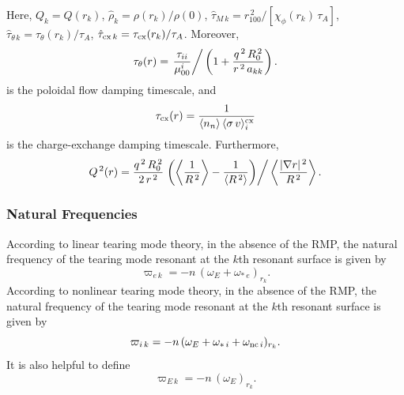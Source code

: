 \documentclass[12pt,prb,aps]{revtex4-1}
\begin{document}
Here, $Q_k = Q(r_k)$, $\hat{\rho}_k=\rho(r_k)/\rho(0)$, $\hat{\tau}_{M\,k}= r_{100}^{\,2}/[\chi_\phi(r_k)\,\tau_A]$,  $\hat{\tau}_{\theta\,k}=\tau_\theta(r_k)/\tau_A$, $\hat{\tau}_{{\rm cx}\,k} =\tau_{{\rm cx}}(r_k)/\tau_A$. 
Moreover, 
\begin{equation}\label{a70}
\tau_\theta(r) = \left. \frac{\tau_{ii}}{\mu_{00}^i}\right/\left(1+\frac{q^{\,2}\,R_0^{\,2}}{r^{\,2}\,a_{kk}}\right).
\end{equation}
is the poloidal flow damping timescale, 
and
\begin{equation}
\tau_{\rm cx}(r)=\frac{1}{\langle n_n\rangle\,\langle \sigma\,v\rangle_i^{\rm cx}}
\end{equation}
is the charge-exchange damping timescale. 
Furthermore,\cite{hir}
\begin{equation}\label{a71}
Q^{\,2}(r) =\frac{q^{\,2}\,R_0^{\,2}}{2\,r^{\,2}}\left.\left(\left\langle\frac{1}{R^{\,2}}\right\rangle-\frac{1}{\langle R^{\,2}\rangle}\right)\right/\left\langle \frac{|\nabla r|^{\,2}}{R^{\,2}}\right\rangle.
\end{equation}

\subsubsection{Natural Frequencies}\label{snat}
According to linear tearing mode theory, in the absence of the RMP, the natural frequency of the tearing mode resonant at the $k$th resonant surface is given by\,\cite{rftor,cole}
\begin{equation}\label{elin}
 \varpi_{e\,k} = - n\,(\omega_E+\omega_{\ast\,e})_{r_k}.
\end{equation}
According to nonlinear tearing mode theory, in the absence of the RMP, 
the natural frequency of the tearing mode resonant at the $k$th resonant surface is given by\,\cite{rftor,rfx,rfy}
\begin{equation}\label{e28y}
 \varpi_{i\,k}=  -n\,(\omega_E+\omega_{\ast\,i}+\omega_{{\rm nc}\,i})_{r_k}.
 \end{equation}
 It is also helpful to define
 \begin{equation}
 \varpi_{E\,k}=  -n\,(\omega_E)_{r_k}.
 \end{equation}
\end{document}
